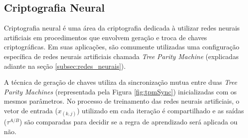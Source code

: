 \documentclass[12pt]{article}
\begin{document}
            
            
        \subsection{Criptografia Neural}
        \label{subsec:criptografia_neural}
        
            Criptografia neural é uma área da criptografia dedicada à utilizar redes neurais artificiais em procedimentos que envolvem geração e troca de chaves criptográficas. Em suas aplicações, são comumente utilizadas uma configuração específica de redes neurais artificiais chamada \textit{Tree Parity Machine} (explicadas adiante na seção \ref{subsec:redes_neurais}).
            
            A técnica de geração de chaves utiliza da sincronização mutua entre duas \textit{Tree Parity Machines} (representada pela Figura \ref{fig:tpmSync}) inicializadas com os mesmos parâmetros. No processo de treinamento das redes neurais artificiais, o vetor de entrada ($x_{(k,j)}$) utilizado em cada iteração é compartilhado e as saídas ($\tau^{A/B}$) são comparadas para decidir se a regra de aprendizado será aplicada ou não.
            
\end{document}
